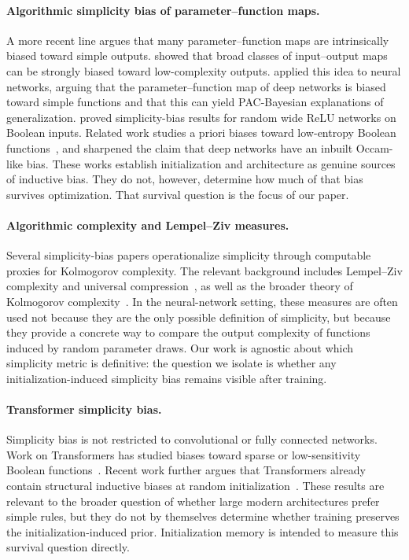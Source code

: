 \documentclass{article}
\begin{document}
\paragraph{Algorithmic simplicity bias of parameter--function maps.}
A more recent line argues that many parameter--function maps are intrinsically biased toward simple outputs.  \citep{dingle2018input} showed that broad classes of input--output maps can be strongly biased toward low-complexity outputs.  \citep{valle2019deep} applied this idea to neural networks, arguing that the parameter--function map of deep networks is biased toward simple functions and that this can yield PAC-Bayesian explanations of generalization.  \citep{depalma2019random} proved simplicity-bias results for random wide ReLU networks on Boolean inputs.  Related work studies a priori biases toward low-entropy Boolean functions~\citep{mingard2020neural}, and \citep{mingard2025occam} sharpened the claim that deep networks have an inbuilt Occam-like bias.  These works establish initialization and architecture as genuine sources of inductive bias.  They do not, however, determine how much of that bias survives optimization.  That survival question is the focus of our paper.

\paragraph{Algorithmic complexity and Lempel--Ziv measures.}
Several simplicity-bias papers operationalize simplicity through computable proxies for Kolmogorov complexity.  The relevant background includes Lempel--Ziv complexity and universal compression~\citep{lempel1976complexity,ziv1977universal}, as well as the broader theory of Kolmogorov complexity~\citep{li2008kolmogorov}.  In the neural-network setting, these measures are often used not because they are the only possible definition of simplicity, but because they provide a concrete way to compare the output complexity of functions induced by random parameter draws.  Our work is agnostic about which simplicity metric is definitive: the question we isolate is whether any initialization-induced simplicity bias remains visible after training.

\paragraph{Transformer simplicity bias.}
Simplicity bias is not restricted to convolutional or fully connected networks.  Work on Transformers has studied biases toward sparse or low-sensitivity Boolean functions~\citep{bhattamishra2023simplicity,hahn2024sensitive,vasudeva2025transformers}.  Recent work further argues that Transformers already contain structural inductive biases at random initialization~\citep{li2026transformersborn}.  These results are relevant to the broader question of whether large modern architectures prefer simple rules, but they do not by themselves determine whether training preserves the initialization-induced prior.  Initialization memory is intended to measure this survival question directly.
\end{document}
